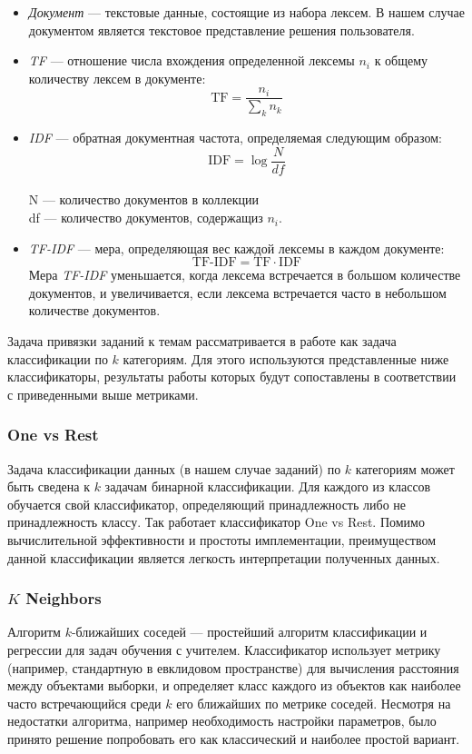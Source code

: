 \documentclass[14pt]{matmex-diploma-custom}
\begin{document}
\begin{itemize}
    \item \textit{Документ} --- текстовые данные, состоящие из набора лексем. В нашем случае документом является текстовое представление решения пользователя.
    \item \textit{TF } --- отношение числа вхождения определенной лексемы $n_{i}$ к общему количеству лексем в документе:
    \[
    \text{TF}=\frac{n_{i}}{\sum_{k}n_{k}}
    \]
    \item \textit{IDF } --- обратная документная частота, определяемая следующим образом: 
    \[
    \text{IDF}=\log\frac{N}{df}
    \]
    \\N --- количество документов в коллекции
    \\df --- количество документов, содержащиз $n_{i}$.
    \item \textit{TF-IDF} --- мера, определяющая вес каждой лексемы в каждом документе:
    \[
    \text{TF-IDF}= \text{TF}\cdot\text{IDF}
    \]
    Мера \textit{TF-IDF} уменьшается, когда лексема встречается в большом количестве документов, и увеличивается, если лексема встречается часто в небольшом количестве документов.
\end{itemize}

Задача привязки заданий к темам рассматривается в работе как задача классификации по $k$ категориям. Для этого используются представленные ниже классификаторы, результаты работы которых будут сопоставлены в соответствии с приведенными выше метриками.

\subsubsection*{One vs Rest}

Задача классификации данных (в нашем случае заданий) по $k$ категориям может быть сведена к $k$ задачам бинарной классификации. Для каждого из классов обучается свой классификатор, определяющий принадлежность либо не принадлежность классу. Так работает классификатор One vs Rest. Помимо вычислительной эффективности и простоты имплементации, преимуществом данной классификации является легкость интерпретации полученных данных.

\subsubsection*{$K$ Neighbors}

Алгоритм $k$-ближайших соседей --- простейший алгоритм классификации и регрессии для задач обучения с учителем. Классификатор использует метрику (например, стандартную в евклидовом пространстве) для вычисления расстояния между объектами выборки, и определяет класс каждого из объектов как наиболее часто встречающийся среди $k$ его ближайших по метрике соседей. Несмотря на недостатки алгоритма, например необходимость настройки параметров, было принято решение попробовать его как классический и наиболее простой вариант.
\end{document}
